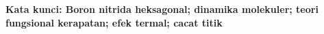 
\vspace{5mm}

\noindent \textbf{Kata kunci: Boron nitrida heksagonal; dinamika molekuler; teori fungsional kerapatan; efek termal; cacat titik} \textit{} %

\newpage


